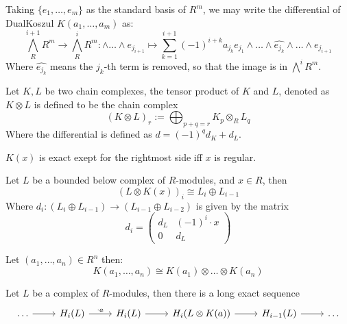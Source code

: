 \begin{definition}
\begin{proposition}
	\label{prop:diff_of_dual_koszul}
	Taking $\{e_1, \dots, e_m\}$ as the standard basis of $R^m$, we may write the differential of DualKoszul $K(a_1, \dots, a_m)$ as:
	$$\bigwedge^{i+1}_R R^m \to \bigwedge^i_R R^m: \wedge \dots \wedge e_{j_{i+1}} \mapsto \sum_{k=1}^{i+1} (-1)^{i+k} a_{j_k} e_{j_{1}} \wedge \dots \wedge \widehat{e_{j_k}} \wedge \dots \wedge e_{j_{i+1}}$$
	Where $\widehat{e_{j_k}}$ means the $j_k$-th term is removed, so that the image is in $\bigwedge^{i} R^m$.
\end{proposition}

\begin{definition}
	\label{def:complex_tensor_product}
	Let $K, L$ be two chain complexes, the tensor product of $K$ and $L$, denoted as $K \otimes L$ is defined to be the chain complex
	$$(K \otimes L)_r := \bigoplus_{p + q = r}K_p \otimes_R L_q$$
	Where the differential is defined as $d = (-1)^q d_K + d_L$.
\end{definition}

\begin{lemma}
	\label{lem:koszul_of_length_2}
	$K(x)$ is exact exept for the rightmost side iff $x$ is regular.
\end{lemma}

\begin{lemma}
	\label{lem:koszul_tensor_as_mapping_cone}
	Let $L$ be a bounded below complex of $R$-modules, and $x \in R$, then
	$$(L \otimes K(x))_i \cong L_i \oplus L_{i-1}$$
	Where $d_i: (L_i \oplus L_{i-1}) \to (L_{i-1}\oplus L_{i-2})$ is given by the matrix
	$$d_i = \begin{pmatrix}d_L & (-1)^i \cdot x \\ 0 & d_L\end{pmatrix}$$
\end{lemma}

\begin{theorem}
	\label{thm:long_koszul_build_by_tensoring}
	Let $(a_1, \dots, a_n) \in R^n$ then:
	$$K(a_1, \dots, a_n) \cong K(a_1) \otimes \dots \otimes K(a_n)$$
\end{theorem}

\begin{lemma}
	\label{lem:koszul_induces_long_exact_seq}
	Let $L$ be a complex of $R$-modules, then there is a long exact sequence
\[\begin{tikzcd}
	\dots & {H_i(L)} & {H_i(L)} & {H_i(L\otimes K(a))} & {H_{i-1}(L)} & \dots
	\arrow[from=1-1, to=1-2]
	\arrow["{\cdot a}", from=1-2, to=1-3]
	\arrow[from=1-3, to=1-4]
	\arrow[from=1-4, to=1-5]
	\arrow[from=1-5, to=1-6]
\end{tikzcd}\]


\end{lemma}
\end{definition}
